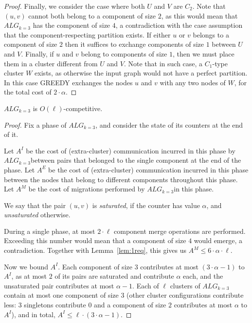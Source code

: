 \documentclass[manuscript,screen=true]{acmart}
\newcommand{\TAlg}{{\ensuremath{ALG_{k=3}}}} %
\begin{document}
\begin{appendix}
\begin{proof}
      Finally, we consider the case where both $U$ and $V$ are $C_2$. Note that $(u,v)$ cannot both belong to a component of size $2$, as this would mean that \TAlg{} has the component of size $4$, a contradiction with the case assumption that the component-respecting partition exists. 
      If either $u$ or $v$ belongs to a component of size $2$ then it suffices to exchange components of size $1$ between $U$ and $V$.
      Finally, if $u$ and $v$ belong to components of size $1$, then we must place them in a cluster different from $U$ and $V$.
      Note that in such case, a $C_1$-type cluster $W$ exists, as otherwise the input graph would not have a perfect partition. In this case GREEDY exchanges the nodes $u$ and $v$ with any two nodes of $W$, for the total cost of $2\cdot \alpha$.
  \end{proof}
  
  
  \begin{theorem}
    \TAlg{} is $O(\ell)$-competitive.
  \end{theorem}
  \begin{proof}
    Fix a phase of \TAlg, and consider the state of its counters at the end of it.

    Let $A^I$ be the cost of (extra-cluster) communication incurred in this phase by \TAlg between pairs that belonged to the single component at the end of the phase.
    Let $A^E$ be the cost of (extra-cluster) communication incurred in this phase between the nodes that belong to different components throughout this phase.
    Let $A^M$ be the cost of migrations performed by \TAlg in this phase.

    We say that the pair $(u, v)$ is \emph{saturated}, if the counter has value $\alpha$, and \emph{unsaturated} otherwise.
    

    During a single phase, at most $2\cdot \ell$ component merge operations are performed.
    Exceeding this number would mean that a component of size $4$ would emerge, a contradiction.
    Together with Lemma~\ref{lem:1req}, this gives us $A^M \leq 6\cdot\alpha\cdot\ell$.
    
    Now we bound $A^I$.
    Each component of size $3$ contributes at most $(3\cdot \alpha - 1)$ to $A^I$, as at most $2$ of its pairs are saturated and contribute $\alpha$ each, and the unsaturated pair contributes at most $\alpha-1$.
    Each of $\ell$ clusters of \TAlg contain at most one component of size $3$ (other cluster configurations contribute less: $3$ singletons contribute $0$ and a component of size $2$ contributes at most $\alpha$ to $A^I$), and in total, $A^I \leq \ell \cdot (3\cdot \alpha-1)$.


\end{proof}
\end{appendix}
\end{document}
